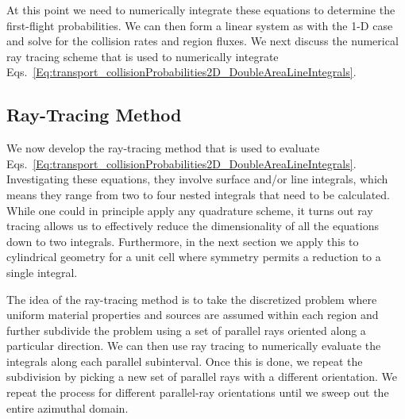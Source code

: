 At this point we need to numerically integrate these equations to determine the first-flight probabilities. We can then form a linear system as with the 1-D case and solve for the collision rates and region fluxes. We next discuss the numerical ray tracing scheme that is used to numerically integrate Eqs.~\eqref{Eq:transport_collisionProbabilities2D_DoubleAreaLineIntegrals}.




\subsection{Ray-Tracing Method}

We now develop the ray-tracing method that is used to evaluate Eqs.~\eqref{Eq:transport_collisionProbabilities2D_DoubleAreaLineIntegrals}. Investigating these equations, they involve surface and/or line integrals, which means they range from two to four nested integrals that need to be calculated. While one could in principle apply any quadrature scheme, it turns out ray tracing allows us to effectively reduce the dimensionality of all the equations down to two integrals. Furthermore, in the next section we apply this to cylindrical geometry for a unit cell where symmetry permits a reduction to a single integral.

The idea of the ray-tracing method is to take the discretized problem where uniform material properties and sources are assumed within each region and further subdivide the problem using a set of parallel rays oriented along a particular direction. We can then use ray tracing to numerically evaluate the integrals along each parallel subinterval. Once this is done, we repeat the subdivision by picking a new set of parallel rays with a different orientation. We repeat the process for different parallel-ray orientations until we sweep out the entire azimuthal domain.

